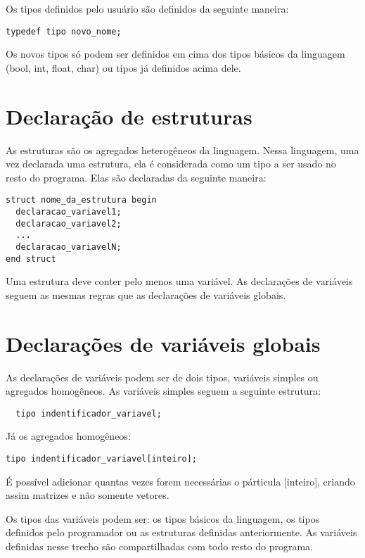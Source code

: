 \documentclass[12pt,oneside,a4paper,english]{abntex2}
\begin{document}
  Os tipos definidos pelo usuário são definidos da seguinte maneira:

\begin{lstlisting}
typedef tipo novo_nome;
\end{lstlisting}

  Os novos tipos só podem ser definidos em cima dos tipos básicos da linguagem (bool, int, float, char) ou tipos já definidos acima dele.

  \section{Declaração de estruturas}

  As estruturas são os agregados heterogêneos da linguagem. Nessa linguagem, uma vez declarada uma estrutura, ela é considerada como um tipo a ser usado no resto do programa. Elas são declaradas da seguinte maneira:

\begin{lstlisting}
struct nome_da_estrutura begin 
  declaracao_variavel1; 
  declaracao_variavel2; 
  ... 
  declaracao_variavelN; 
end struct
\end{lstlisting}

  Uma estrutura deve conter pelo menos uma variável. As declarações de variáveis seguem as mesmas regras que as declarações de variáveis globais.

  \section{Declarações de variáveis globais}

  As declarações de variáveis podem ser de dois tipos, variáveis simples ou agregados homogêneos. As variáveis simples seguem a seguinte estrutura:

\begin{lstlisting}
  tipo indentificador_variavel;
\end{lstlisting}

  Já os agregados homogêneos:

\begin{lstlisting}
tipo indentificador_variavel[inteiro];
\end{lstlisting}

  É possível adicionar quantas vezes forem necessárias o párticula [inteiro], criando assim matrizes e não somente vetores.

  Os tipos das variáveis podem ser: os tipos básicos da linguagem, os tipos definidos pelo programador ou as estruturas definidas anteriormente. As variáveis definidas nesse trecho são compartilhadas com todo resto do programa.
\end{document}
